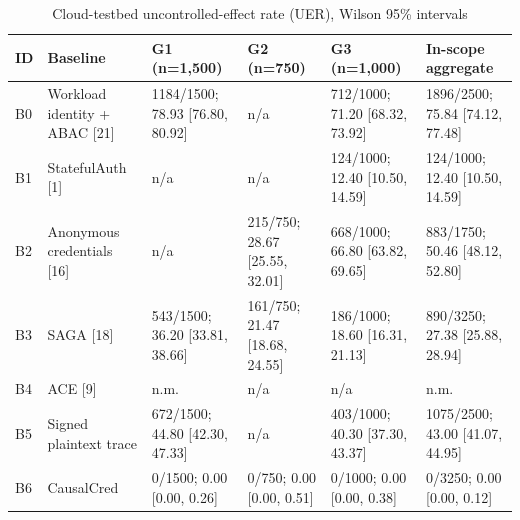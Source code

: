 \begin{table}[t]
\centering
\caption{Cloud-testbed uncontrolled-effect rate (UER), Wilson 95\% intervals}
\begin{tabular}{llllll}
\hline
ID & Baseline & G1 (n=1,500) & G2 (n=750) & G3 (n=1,000) & In-scope aggregate \\
\hline
B0 & Workload identity + ABAC [21] & 1184/1500; 78.93 [76.80, 80.92] & n/a & 712/1000; 71.20 [68.32, 73.92] & 1896/2500; 75.84 [74.12, 77.48] \\
B1 & StatefulAuth [1] & n/a & n/a & 124/1000; 12.40 [10.50, 14.59] & 124/1000; 12.40 [10.50, 14.59] \\
B2 & Anonymous credentials [16] & n/a & 215/750; 28.67 [25.55, 32.01] & 668/1000; 66.80 [63.82, 69.65] & 883/1750; 50.46 [48.12, 52.80] \\
B3 & SAGA [18] & 543/1500; 36.20 [33.81, 38.66] & 161/750; 21.47 [18.68, 24.55] & 186/1000; 18.60 [16.31, 21.13] & 890/3250; 27.38 [25.88, 28.94] \\
B4 & ACE [9] & n.m. & n/a & n/a & n.m. \\
B5 & Signed plaintext trace & 672/1500; 44.80 [42.30, 47.33] & n/a & 403/1000; 40.30 [37.30, 43.37] & 1075/2500; 43.00 [41.07, 44.95] \\
B6 & CausalCred & 0/1500; 0.00 [0.00, 0.26] & 0/750; 0.00 [0.00, 0.51] & 0/1000; 0.00 [0.00, 0.38] & 0/3250; 0.00 [0.00, 0.12] \\
\hline
\end{tabular}
\end{table}
